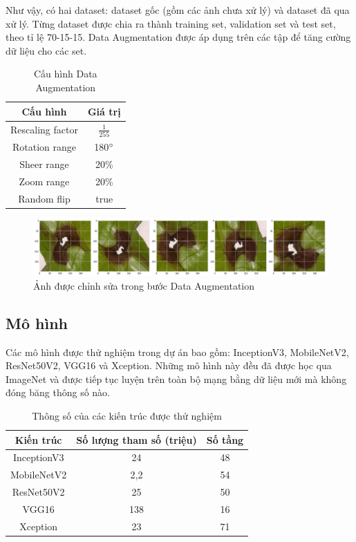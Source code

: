 \documentclass[a4paper,14pt]{extarticle}
\begin{document}
	Như vậy, có hai dataset: dataset gốc (gồm các ảnh chưa xử lý) và dataset đã qua xử lý. Từng dataset được chia ra thành training set, validation set và test set, theo tỉ lệ 70-15-15. Data Augmentation được áp dụng trên các tập để tăng cường dữ liệu cho các set.

	\begin{table}[H]
		\centering
		\renewcommand{\arraystretch}{1.2}
		\begin{tabular}{|c|c|}
		\hline
		Cấu hình         & Giá trị         \\ \hline
		Rescaling factor & $\frac{1}{255}$ \\ \hline
		Rotation range   & 180$\degree$    \\ \hline
		Sheer range      & 20\%            \\ \hline
		Zoom range       & 20\%            \\ \hline
		Random flip      & true            \\ \hline
		\end{tabular}

		\caption{Cấu hình Data Augmentation}
	\end{table}

	\begin{figure}[H]
		\centering
		\includegraphics[scale=0.25]{images/image2}
		\caption{Ảnh được chỉnh sửa trong bước Data Augmentation}
	\end{figure}

	\subsection{Mô hình}
	Các mô hình được thử nghiệm trong dự án bao gồm: InceptionV3, MobileNetV2, ResNet50V2, VGG16 và Xception. Những mô hình này đều đã được học qua ImageNet và được tiếp tục luyện trên toàn bộ mạng bằng dữ liệu mới mà không đóng băng thông số nào.

	\begin{table}[H]
		\centering
		\begin{tabular}{|c|c|c|}
		\hline
		Kiến trúc   & Số lượng tham số (triệu) & Số tầng \\ \hline
		InceptionV3 & 24                       & 48      \\
		MobileNetV2 & 2,2                      & 54      \\
		ResNet50V2  & 25                       & 50      \\
		VGG16       & 138                      & 16      \\
		Xception    & 23                       & 71      \\ \hline
		\end{tabular}

		\caption{Thông số của các kiến trúc được thử nghiệm}
	\end{table}
\end{document}
